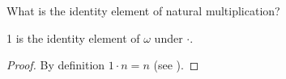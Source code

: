 

What is the identity element of natural multiplication?

\begin{proposition}
  1 is the identity element of $\omega$ under $\cdot$.
\end{proposition}
\begin{proof}
  By definition $1 \cdot n = n$ (see ).
\end{proof}

\blankpage
